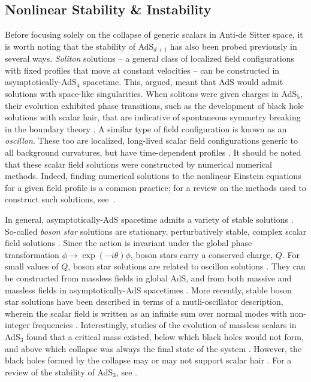\documentclass[../PhD.tex]{subfiles}
\begin{document}

\subsection{Nonlinear Stability \& Instability}
\label{ssec: stability intro}

Before focusing solely on the collapse of generic scalars in Anti-de Sitter space, it is worth noting that the stability of AdS$_{d+1}$ has also been probed previously in several ways. \emph{Soliton} solutions -- a general class of localized field configurations with fixed profiles that move at constant velocities -- can be constructed in asymptotically-AdS$_4$ spacetime. This, \cite{hep-th/0406134} argued, meant that AdS would admit solutions with space-like singularities. When solitons were given charges in AdS$_5$, their evolution exhibited phase transitions, such as the development of black hole solutions with scalar hair, that are indicative of spontaneous symmetry breaking in the boundary theory \cite{1301.2452}. A similar type of field configuration is known as an \emph{oscillon}. These too are localized, long-lived scalar field configurations generic to all background curvatures, but have time-dependent profiles \cite{hep-ph/9503217}. It should be noted that these scalar field solutions were constructed by numerical numerical methods. Indeed, finding numerical solutions to the nonlinear Einstein equations for a given field profile is a common practice; for a review on the methods used to construct such solutions, see~\cite{1510.02804}. 

In general, asymptotically-AdS spacetime admits a variety of stable solutions \cite{1208.5772, 1503.07746}. So-called \emph{boson star} solutions are stationary, perturbatively stable, complex scalar field solutions \cite{gr-qc/0309131}. Since the \ads action is invariant under the global phase transformation $\phi \to \exp(-i\theta) \phi$, boson stars carry a conserved charge, $Q$. For small values of $Q$, boson star solutions are related to oscillon solutions \cite{1304.4166}. They can be constructed from massless fields in global AdS, and from both massive and massless fields in asymptotically-AdS spacetimes \cite{1209.2378}. More recently, stable boson star solutions have been described in terms of a mutli-oscillator description, wherein the scalar field is written as an infinite sum over normal modes with non-integer frequencies \cite{1904.02168}. Interestingly, studies of the evolution of massless scalars in AdS$_3$ found that a critical mass existed, below which black holes would not form, and above which collapse was always the final state of the system \cite{hep-th/9204099}. However, the black holes formed by the collapse may or may not support scalar hair \cite{gr-qc/0007008, gr-qc/0008060, 1303.3186, 1211.7076}. For a review of the stability of AdS$_3$, see \cite{1306.0317}. 
\end{document}
